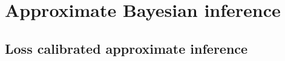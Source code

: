 \part{Approximate Bayesian inference}

\chapter{Loss calibrated approximate inference\label{sec:approximate_inference}}


